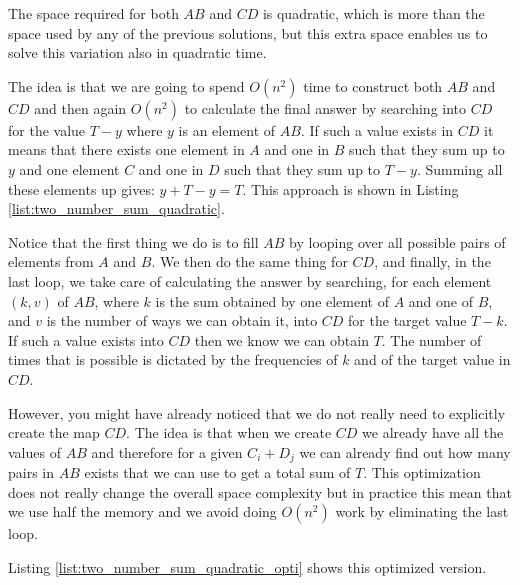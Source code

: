 The space required for both $AB$ and $CD$ is quadratic, which is more than the space used by any of the previous solutions, but this extra space
enables us to solve this variation also in quadratic time. 

The idea is that we are going to spend $O(n^2)$ time to construct both $AB$ and $CD$
and then again $O(n^2)$ to calculate the final answer 
by searching into $CD$ for the value $T-y$ where $y$ is an element of $AB$. 
If such a value exists in $CD$ it means that there exists one element in  $A$ and one in $B$ such that they sum up to $y$ and
one element $C$ and one in $D$ such that they sum up to $T-y$. Summing all these elements up gives: $y+T-y = T$.
This approach is shown in Listing \ref{list:two_number_sum_quadratic}. 



Notice that the first thing we do is to fill $AB$ by looping over all possible pairs of elements from $A$ and $B$.
We then do the same thing for $CD$, and finally, in the last loop, we take care of calculating the answer by searching, for each element $(k,v)$ of $AB$, where $k$ is the sum obtained by one element of $A$ and one of $B$, and $v$ is the number of ways we can obtain it,
into $CD$ for the target value $T-k$. If such a value exists into $CD$ then we know we can obtain $T$. The number of times
that is possible is dictated by the frequencies of $k$ and of the target value in $CD$.

However, you might have already noticed that we do not really need to explicitly create the map $CD$. 
The idea is that when we create $CD$ we already have all the values of $AB$  and therefore for a given $C_i+D_j$ we can already find out how many pairs in $AB$ exists that we can use to get a total sum of $T$. 
This optimization does not really change the overall space complexity
but in practice this mean that we use half the memory and we avoid doing $O(n^2)$ work by eliminating the last loop.

Listing \ref{list:two_number_sum_quadratic_opti} shows this optimized version.



